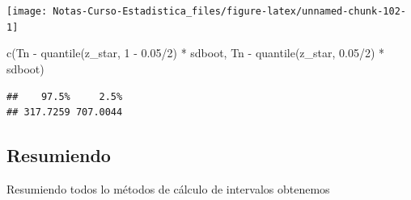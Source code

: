 \documentclass[
  12pt,
]{book}
\newenvironment{Shaded}{\begin{snugshade}}{\end{snugshade}}
\newcommand{\DecValTok}[1]{\textcolor[rgb]{0.00,0.00,0.81}{#1}}
\newcommand{\FloatTok}[1]{\textcolor[rgb]{0.00,0.00,0.81}{#1}}
\newcommand{\FunctionTok}[1]{\textcolor[rgb]{0.00,0.00,0.00}{#1}}
\newcommand{\NormalTok}[1]{#1}
\newcommand{\SpecialCharTok}[1]{\textcolor[rgb]{0.00,0.00,0.00}{#1}}
\begin{document}
\begin{center}\texttt{[image: Notas-Curso-Estadistica\_files/figure-latex/unnamed-chunk-102-1]} \end{center}

\begin{Shaded}
\begin{Highlighting}[]
\FunctionTok{c}\NormalTok{(Tn }\SpecialCharTok{{-}} \FunctionTok{quantile}\NormalTok{(z\_star, }\DecValTok{1} \SpecialCharTok{{-}} \FloatTok{0.05}\SpecialCharTok{/}\DecValTok{2}\NormalTok{) }\SpecialCharTok{*}\NormalTok{ sdboot, Tn }\SpecialCharTok{{-}}
    \FunctionTok{quantile}\NormalTok{(z\_star, }\FloatTok{0.05}\SpecialCharTok{/}\DecValTok{2}\NormalTok{) }\SpecialCharTok{*}\NormalTok{ sdboot)}
\end{Highlighting}
\end{Shaded}

\begin{verbatim}
##    97.5%     2.5% 
## 317.7259 707.0044
\end{verbatim}

\hypertarget{resumiendo}{%
\subsection{Resumiendo}\label{resumiendo}}

Resumiendo todos lo métodos de cálculo de intervalos obtenemos
\end{document}
